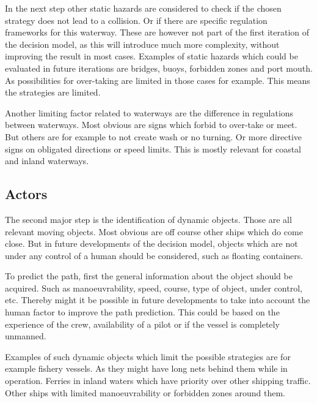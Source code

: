 In the next step other static hazards are considered to check if the chosen strategy does not lead to a collision. Or if there are specific regulation frameworks for this waterway. These are however not part of the first iteration of the decision model, as this will introduce much more complexity, without improving the result in most cases. Examples of static hazards which could be evaluated in future iterations are bridges, buoys, forbidden zones and port mouth. As possibilities for over-taking are limited in those cases for example. This means the strategies are limited.

Another limiting factor related to waterways are the difference in regulations between waterways. Most obvious are signs which forbid to over-take or meet. But others are for example to not create wash or no turning. Or more directive signs on obligated directions or speed limits. This is mostly relevant for coastal and inland waterways.


\subsection{Actors}
The second major step is the identification of dynamic objects. Those are all relevant moving objects. Most obvious are off course other ships which do come close. But in future developments of the decision model, objects which are not under any control of a human should be considered, such as floating containers.

To predict the path, first the general information about the object should be acquired. Such as manoeuvrability, speed, course, type of object, under control, etc.
Thereby might it be possible in future developments to take into account the human factor to improve the path prediction. This could be based on the experience of the crew, availability of a pilot or if the vessel is completely unmanned.

Examples of such dynamic objects which limit the possible strategies are for example fishery vessels. As they might have long nets behind them while in operation. Ferries in inland waters which have priority over other shipping traffic. Other ships with limited manoeuvrability or forbidden zones around them. 

